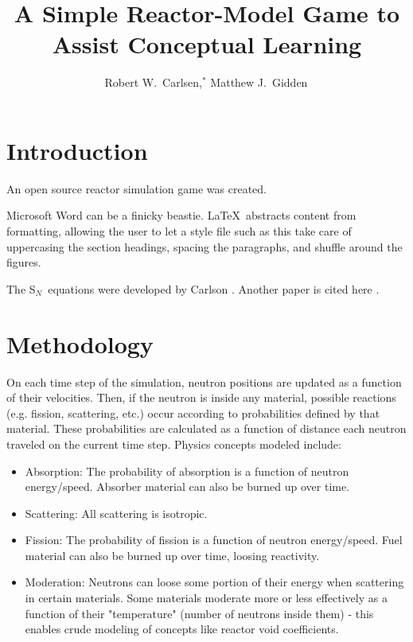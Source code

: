 \documentclass{anstrans}
\title{A Simple Reactor-Model Game to Assist Conceptual Learning}
\author{Robert W.~Carlsen,$^{*}$ Matthew J.~Gidden$^{\*}$}
\institute{
$^{*}$University of Wisconsin, Nuclear Engineering Dept., 1500 Engineering Dr., Madison, WI
}
\newcommand{\SN}{S$_N$}
\begin{document}
\section{Introduction}

An open source reactor simulation game was created.

Microsoft Word can be a finicky beastie. \LaTeX\ abstracts content from
formatting, allowing the user to let a style file such as this take care of
uppercasing the section headings, spacing the paragraphs, and shuffle around
the figures.

The \SN\ equations were developed by Carlson \cite{Car1953}. Another
paper is cited here \cite{Lar2008}.

\section{Methodology}

On each time step of the simulation, neutron positions are updated as a
function of their velocities.  Then, if the neutron is inside any material,
possible reactions (e.g. fission, scattering, etc.) occur according to
probabilities defined by that material.  These probabilities are calculated as
a function of distance each neutron traveled on the current time step.
Physics concepts modeled include:

\begin{itemize}

    \item Absorption: The probability of absorption is a function of neutron
        energy/speed.  Absorber material can also be burned up over time.

    \item Scattering: All scattering is isotropic.

    \item Fission: The probability of fission is a function of neutron
        energy/speed.  Fuel material can also be burned up over time, loosing
        reactivity.

    \item Moderation: Neutrons can loose some portion of their energy when
        scattering in certain materials. Some materials moderate more or less
        effectively as a function of their "temperature" (number of neutrons
        inside them) - this enables crude modeling of concepts like reactor
        void coefficients.

\end{itemize}
\end{document}
